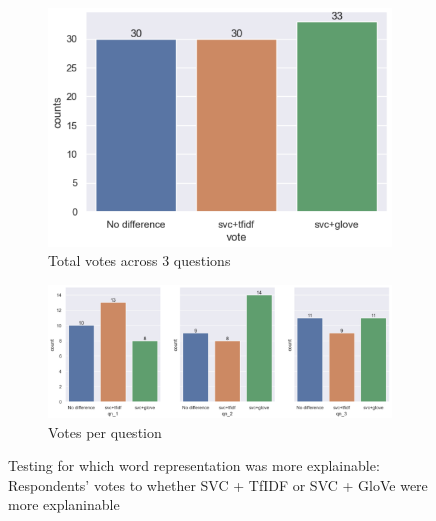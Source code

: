 \begin{figure}[!ht]
    \begin{subfigure}[b]{0.75\textwidth}
      \centering
      \includegraphics[width=1\linewidth]{figures/part5_votes.png}
      \caption{Total votes across 3 questions}
    \end{subfigure}
    \hfill
    \begin{subfigure}[b]{1\textwidth}
      \centering
      \includegraphics[width=1\linewidth]{figures/part_5_votes_1.png}
      \caption{Votes per question}
    \end{subfigure}
    \caption{Testing for which word representation was more explainable: Respondents' votes to whether SVC + TfIDF or SVC + GloVe were more explaninable}
    \label{fig:part5}
\end{figure}